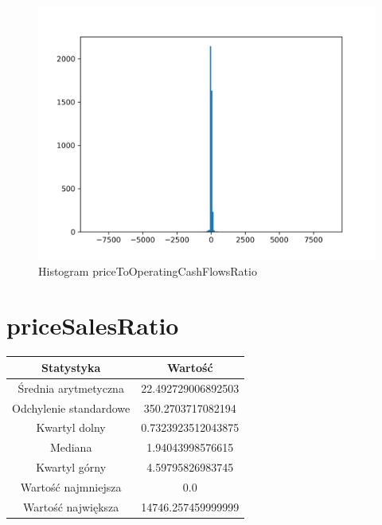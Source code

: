 \documentclass{article}
\begin{document}
\begin{figure}[h!]
    \includegraphics[width=\linewidth]{variables/priceToOperatingCashFlowsRatio.png}
    \caption{Histogram priceToOperatingCashFlowsRatio }
\end{figure}\section{ priceSalesRatio }

\begin{center}
    \begin{tabular}{|c | c|} 
    \hline
    Statystyka & Wartość \\
    \hline\hline
    Średnia arytmetyczna & 22.492729006892503 \\ 
    \hline
    Odchylenie standardowe & 350.2703717082194 \\
    \hline
    Kwartyl dolny & 0.7323923512043875 \\
    \hline
    Mediana & 1.94043998576615 \\
    \hline
    Kwartyl górny & 4.59795826983745 \\
    \hline
    Wartość najmniejsza & 0.0 \\
    \hline
    Wartość największa & 14746.257459999999 \\
    \hline
   \end{tabular}
\end{center}
\end{document}
